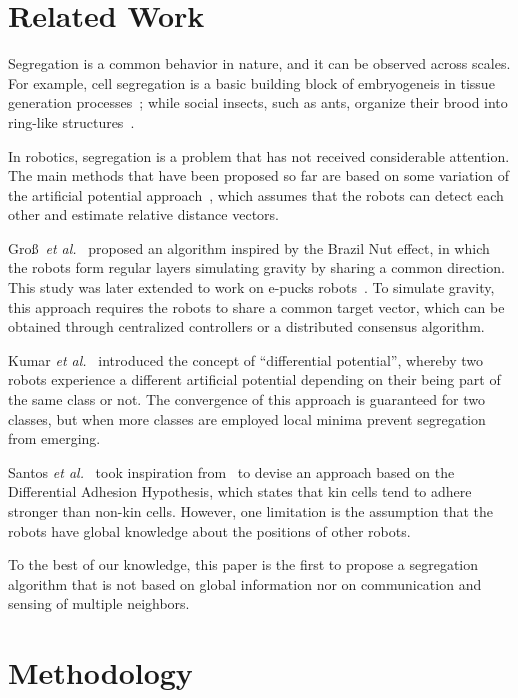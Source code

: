 \documentclass[letterpaper, 10 pt, conference]{ieeeconf}
\begin{document}
\section{Related Work}
Segregation is a common behavior in nature, and it can be observed across
scales. For example, cell segregation is a basic building block of embryogeneis
in tissue generation processes~\cite{batlle_molecular_2012,Steinberg1963}; while
social insects, such as ants, organize their brood into ring-like
structures~\cite{Franks1992}.

In robotics, segregation is a problem that has not received considerable
attention. The main methods that have been proposed so far are based on some
variation of the artificial potential approach~\cite{Spears2004}, which assumes
that the robots can detect each other and estimate relative distance vectors.

Gro\ss~\emph{et al.}~\cite{gross_segregation_2009} proposed an
algorithm inspired by the Brazil Nut effect, in which the robots form regular
layers simulating gravity by sharing a common direction. This study was later
extended to work on e-pucks robots~\cite{Chen2012}. To simulate gravity, this
approach requires the robots to share a common target vector, which can be
obtained through centralized controllers or a distributed consensus algorithm.

Kumar \emph{et al.}~\cite{kumar_segregation_2010} introduced the concept of
``differential potential'', whereby two robots experience a different artificial
potential depending on their being part of the same class or not. The
convergence of this approach is guaranteed for two classes, but when more
classes are employed local minima prevent segregation from emerging.

Santos \emph{et al.}~\cite{santos_segregation_2014} took inspiration
from~\cite{kumar_segregation_2010} to devise an approach based on the
Differential Adhesion Hypothesis, which states that kin cells tend to adhere
stronger than non-kin cells. However, one limitation is the assumption
that the robots have global knowledge about the positions of other robots.

To the best of our knowledge, this paper is the first to propose a segregation
algorithm that is not based on global information nor on communication and
sensing of multiple neighbors.

\section{Methodology}
\end{document}
